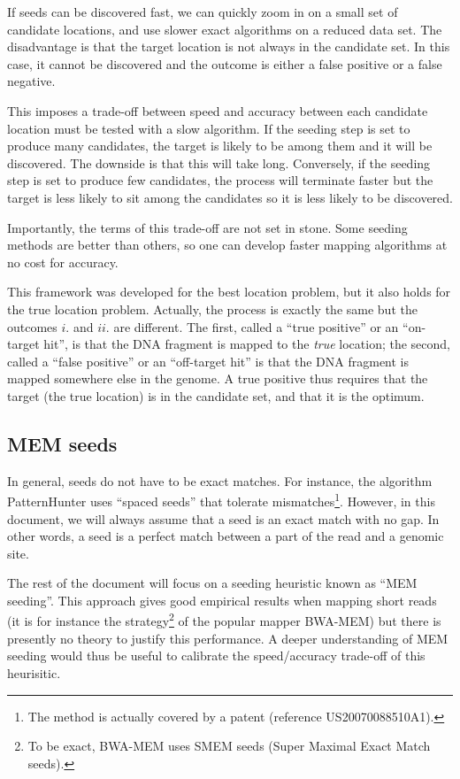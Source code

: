 \documentclass{article}
\begin{document}
If seeds can be discovered fast, we can quickly zoom in on a small set of
candidate locations, and use slower exact algorithms on a reduced data
set. The disadvantage is that the target location is not always in the
candidate set. In this case, it cannot be discovered and the outcome is
either a false positive or a false negative.

This imposes a trade-off between speed and accuracy between each candidate
location must be tested with a slow algorithm. If the seeding step is set
to produce many candidates, the target is likely to be among them and it
will be discovered. The downside is that this will take long. Conversely,
if the seeding step is set to produce few candidates, the process will
terminate faster but the target is less likely to sit among the candidates
so it is less likely to be discovered.

Importantly, the terms of this trade-off are not set in stone. Some
seeding methods are better than others\cite{pmid16533404,pmid20460430}, so
one can develop faster mapping algorithms at no cost for accuracy.

This framework was developed for the best location problem, but it also
holds for the true location problem. Actually, the process is exactly the
same but the outcomes $i.$ and $ii.$ are different. The first, called a
``true positive'' or an ``on-target hit'', is that the DNA fragment is
mapped to the \emph{true} location; the second, called a ``false
positive'' or an ``off-target hit'' is that the DNA fragment is mapped
somewhere else in the genome. A true positive thus requires that the
target (the true location) is in the candidate set, and that it is the
optimum.

\subsection{MEM seeds}

In general, seeds do not have to be exact matches\cite{pmid20460430}. For
instance, the algorithm PatternHunter\cite{pmid11934743} uses ``spaced
seeds'' that tolerate mismatches\footnote{The method is actually covered
by a patent (reference US20070088510A1).}. However, in this document, we
will always assume that a seed is an exact match with no gap. In other
words, a seed is a perfect match between a part of the read and a genomic
site.

The rest of the document will focus on a seeding heuristic known as ``MEM
seeding''. This approach gives good empirical results when mapping short
reads (it is for instance the strategy\footnote{To be exact, BWA-MEM uses
SMEM seeds (Super Maximal Exact Match seeds).} of the popular mapper
BWA-MEM\cite{li2013aligning}) but there is presently no theory to justify
this performance. A deeper understanding of MEM seeding would thus be
useful to calibrate the speed/accuracy trade-off of this heurisitic.
\end{document}
